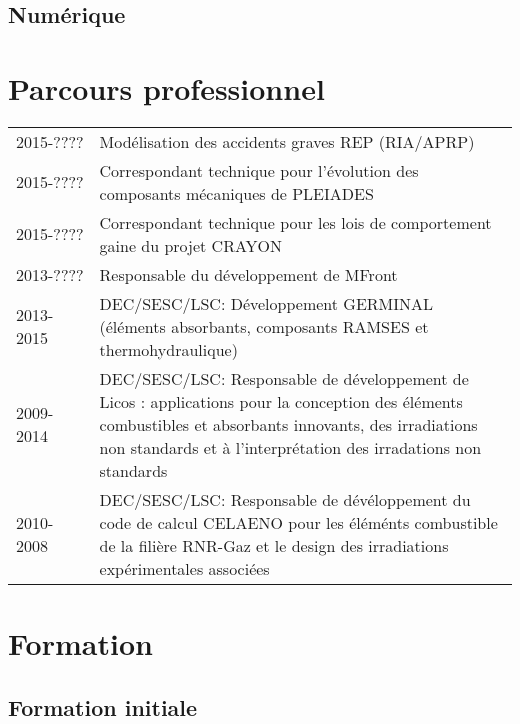 \documentclass[11pt,a4paper]{moderncv}
\let\origsubsection\subsection%
\let\subsection\section%
\let\subsection\origsubsection%
\begin{document}

\subsection{Numérique}


\section{Parcours professionnel}

\begin{tabular}[htbp]{p{0.1\linewidth}p{0.9\linewidth}}
  {\tiny 2015-????} & Modélisation des accidents graves REP (RIA/APRP) \\
  {\tiny 2015-????} & Correspondant technique pour l’évolution des composants mécaniques de PLEIADES \\
  {\tiny 2015-????} & Correspondant technique pour les lois de comportement gaine du projet CRAYON \\
  {\tiny 2013-????} & Responsable du développement de MFront \\
  {\tiny 2013-2015} & DEC/SESC/LSC: Développement GERMINAL (éléments absorbants, composants RAMSES et thermohydraulique) \\
  {\tiny 2009-2014} & DEC/SESC/LSC: Responsable de développement de Licos : applications pour la conception des éléments combustibles et absorbants innovants, des irradiations non standards et à l’interprétation des irradations non standards \\
  {\tiny 2010-2008} & DEC/SESC/LSC: Responsable de dévéloppement du code de calcul CELAENO pour les éléménts combustible de la filière RNR-Gaz et le design des irradiations expérimentales associées \\
\end{tabular}

\section{Formation}

\subsection{Formation initiale}
\end{document}
